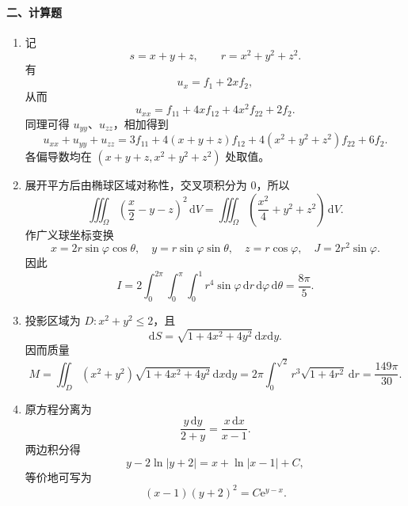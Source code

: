 \paragraph*{二、计算题}
\begin{enumerate}
  \item 记
  \[
    s=x+y+z,\qquad r=x^2+y^2+z^2.
  \]
  有
  \[
    u_x=f_1+2xf_2,
  \]
  从而
  \[
    u_{xx}=f_{11}+4xf_{12}+4x^2f_{22}+2f_2.
  \]
  同理可得 \(u_{yy}\)、\(u_{zz}\)，相加得到
  \[
    u_{xx}+u_{yy}+u_{zz}
    =3f_{11}+4(x+y+z)f_{12}+4(x^2+y^2+z^2)f_{22}+6f_2.
  \]
  各偏导数均在 \((x+y+z,x^2+y^2+z^2)\) 处取值。

  \item 展开平方后由椭球区域对称性，交叉项积分为 \(0\)，所以
  \[
    \iiint_\Omega\left(\frac x2-y-z\right)^2\,\mathrm{d}V
    =\iiint_\Omega\left(\frac{x^2}{4}+y^2+z^2\right)\,\mathrm{d}V.
  \]
  作广义球坐标变换
  \[
    x=2r\sin\varphi\cos\theta,\quad
    y=r\sin\varphi\sin\theta,\quad
    z=r\cos\varphi,\quad J=2r^2\sin\varphi.
  \]
  因此
  \[
    I=2\int_0^{2\pi}\int_0^\pi\int_0^1r^4\sin\varphi\,\mathrm{d}r\,\mathrm{d}\varphi\,\mathrm{d}\theta
    =\frac{8\pi}{5}.
  \]

  \item 投影区域为 \(D:x^2+y^2\le2\)，且
  \[
    \mathrm{d}S=\sqrt{1+4x^2+4y^2}\,\mathrm{d}x\mathrm{d}y.
  \]
  因而质量
  \[
    M=\iint_D(x^2+y^2)\sqrt{1+4x^2+4y^2}\,\mathrm{d}x\mathrm{d}y
    =2\pi\int_0^{\sqrt2}r^3\sqrt{1+4r^2}\,\mathrm{d}r
    =\frac{149\pi}{30}.
  \]

  \item 原方程分离为
  \[
    \frac{y\,\mathrm{d}y}{2+y}=\frac{x\,\mathrm{d}x}{x-1}.
  \]
  两边积分得
  \[
    y-2\ln|y+2|=x+\ln|x-1|+C,
  \]
  等价地可写为
  \[
    (x-1)(y+2)^2=C\mathrm{e}^{y-x}.
  \]
\end{enumerate}

